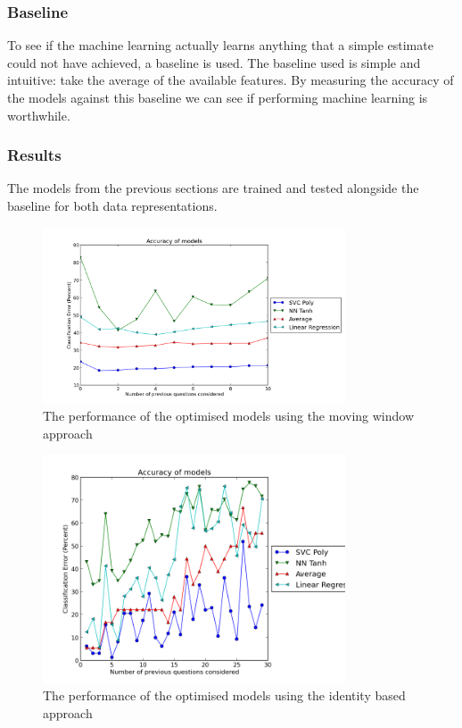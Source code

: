 \subsubsection{Baseline}
To see if the machine learning actually learns anything that a simple estimate could not have achieved, a baseline is used. The baseline used is simple and intuitive: take the average of the available features. By measuring the accuracy of the models against this baseline we can see if performing machine learning is worthwhile.

\subsubsection{Results}
The models from the previous sections are trained and tested alongside the baseline for both data representations.

\begin{figure}[h!]
\centering
\includegraphics[width=0.8\textwidth]{images/finalmovingwindow.png}
\caption{The performance of the optimised models using the moving window approach}
\label{fig:finalmovingwindow}
\end{figure}

\begin{figure}[h!]
\centering
\includegraphics[width=0.8\textwidth]{images/finalidentified.png}
\caption{The performance of the optimised models using the identity based approach}
\label{fig:finalidentified}
\end{figure}

